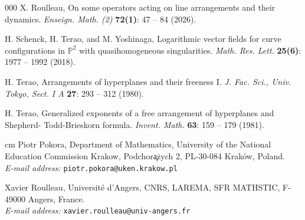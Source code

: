 \documentclass[11pt]{article}
\theoremstyle{plain}
\theoremstyle{definition}
\theoremstyle{plain}
\begin{document}
\begin{thebibliography}{000}
X. Roulleau,  On some operators acting on line arrangements and their dynamics. \textit{Enseign. Math. (2)} \textbf{72(1)}: 47 -- 84 (2026).

H. Schenck, H. Terao, and M. Yoshinaga, Logarithmic vector fields for curve configurations in $\mathbb{P}^{2}$ with quasihomogeneous singularities. \textit{Math. Res. Lett.} \textbf{25(6)}: 1977 -- 1992 (2018).

H. Terao, Arrangements of hyperplanes and their freeness I. \textit{J. Fac. Sci., Univ. Tokyo, Sect. I A} \textbf{27}: 293 -- 312 (1980).

H. Terao, Generalized exponents of a free arrangement of hyperplanes and Shepherd- Todd-Brieskorn formula. \textit{Invent. Math.} \textbf{63}: 159 -- 179 (1981).



\end{thebibliography}



 cm
\bigskip
Piotr Pokora,
Department of Mathematics,
University of the National Education Commission Krakow,
Podchor\c a\.zych 2,
PL-30-084 Krak\'ow, Poland. \\
\nopagebreak
\textit{E-mail address:} \texttt{piotr.pokora@uken.krakow.pl}

\bigskip
Xavier Roulleau,
Universit\'e d'Angers, 
CNRS, LAREMA, SFR MATHSTIC, 
F-49000 Angers, France. \\
\nopagebreak
\textit{E-mail address:} \texttt{xavier.roulleau@univ-angers.fr}
\end{document}
